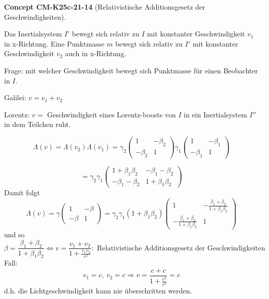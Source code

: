 \documentclass[10pt, letterpaper]{article}
\newcommand{\CustomHeading}[3]{%
  \par\medskip\noindent%
  \textbf{#1 #2} \textnormal{(#3)}.\enskip%
}
\newenvironment{CONC}[2]{\CustomHeading{Concept}{#1}{#2}}{}
\begin{document}
\begin{CONC}{CM-K25c-21-14}{Relativistische Additionsgesetz der Geschwindigkeiten}
Das Inertialsystem $I'$ bewegt sich relativ zu $I$ mit konstanter Geschwindigkeit $v_1$ in x-Richtung. Eine Punktmasse $m$ bewegt sich relativ zu $I'$ mit konstanter Geschwindigkeit $v_2$ auch in x-Richtung.

Frage: mit welcher Geschwindigkeit bewegt sich Punktmasse für einen Beobachter in $I$.

Galilei: $v = v_1 + v_2$

Lorentz: $v =$ Geschwindigkeit eines Lorentz-boosts von $I$ in ein Inertialsystem $I''$ in dem Teilchen ruht.

\[\Lambda(v) = \Lambda(v_2)\Lambda(v_1) = \gamma_2\begin{pmatrix} 1 & -\beta_2 \\ -\beta_2 & 1 \end{pmatrix}\gamma_1\begin{pmatrix} 1 & -\beta_1 \\ -\beta_1 & 1 \end{pmatrix}\]

\[= \gamma_2\gamma_1\begin{pmatrix} 1+\beta_1\beta_2 & -\beta_1-\beta_2 \\ -\beta_1-\beta_2 & 1+\beta_1\beta_2 \end{pmatrix}\]
Damit folgt
\[ \Lambda(v) = \gamma\begin{pmatrix} 1 & -\beta \\ -\beta & 1 \end{pmatrix} = \gamma_2\gamma_1(1+\beta_1\beta_2)\begin{pmatrix} 1 & -\frac{\beta_1+\beta_2}{1+\beta_1\beta_2} \\ -\frac{\beta_1+\beta_2}{1+\beta_1\beta_2} & 1 \end{pmatrix}\]
und so
\[ \beta = \frac{\beta_1+\beta_2}{1+\beta_1\beta_2} \Leftrightarrow v = \frac{v_1+v_2}{1+\frac{v_1v_2}{c^2}} : \text{ Relativistische Additionsgesetz der Geschwindigkeiten}
\]
Fall: 
$$v_1 = c,\ v_2 = c \Rightarrow v = \frac{c+c}{1+\frac{c^2}{c^2}} = c$$ 
d.h. die Lichtgeschwindigkeit kann nie überschritten werden.
\end{CONC}
\end{document}
